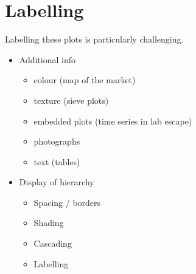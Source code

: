 \documentclass[letterpaper,oneside]{scrartcl}
\begin{document}
\section{Labelling}
\label{sec:legends}

Labelling these plots is particularly challenging.

\begin{itemize}
  \item Additional info 
  \begin{itemize}
    \item colour (map of the market)
    \item texture (sieve plots)
    \item embedded plots (time series in lab escape)
    \item photographs
    \item text (tables)
  \end{itemize}
  
  \item Display of hierarchy
  \begin{itemize}
    \item Spacing / borders
    \item Shading
    \item Cascading
    \item Labelling
  \end{itemize}
\end{itemize}


\end{document}

